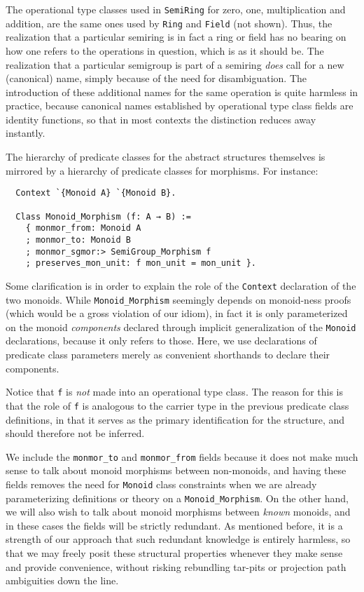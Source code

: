\documentclass[a4paper,10pt,runningheads]{llncs}
\begin{document}
The operational type classes used in \lstinline|SemiRing| for zero, one, multiplication and addition, are the same ones used by \lstinline|Ring| and \lstinline|Field| (not shown). Thus, the realization that a particular semiring is in fact a ring or field has no bearing on how one refers to the operations in question, which is as it should be. The realization that a particular semigroup is part of a semiring \emph{does} call for a new (canonical) name, simply because of the need for disambiguation. The introduction of these additional names for the same operation is quite harmless in practice, because canonical names established by operational type class fields are identity functions, so that in most contexts the distinction reduces away instantly.

The hierarchy of predicate classes for the abstract structures themselves is mirrored by a hierarchy of predicate classes for morphisms. For instance:
\begin{lstlisting}
  Context `{Monoid A} `{Monoid B}.

  Class Monoid_Morphism (f: A → B) :=
    { monmor_from: Monoid A
    ; monmor_to: Monoid B
    ; monmor_sgmor:> SemiGroup_Morphism f
    ; preserves_mon_unit: f mon_unit = mon_unit }.
\end{lstlisting}

Some clarification is in order to explain the role of the \lstinline|Context| declaration of the two monoids. While \lstinline|Monoid_Morphism| seemingly depends on monoid-ness proofs (which would be a gross violation of our idiom), in fact it is only parameterized on the monoid \emph{components} declared through implicit generalization of the \lstinline|Monoid| declarations, because it only refers to those. Here, we use declarations of predicate class parameters merely as convenient shorthands to declare their components.

Notice that \lstinline|f| is \emph{not} made into an operational type class. The reason for this is that the role of \lstinline|f| is analogous to the carrier type in the previous predicate class definitions, in that it serves as the primary identification for the structure, and should therefore not be inferred.

We include the \lstinline|monmor_to| and \lstinline|monmor_from| fields because it does not make much sense to talk about monoid morphisms between non-monoids, and having these fields removes the need for \lstinline|Monoid| class constraints when we are already parameterizing definitions or theory on a \lstinline|Monoid_Morphism|. On the other hand, we will also wish to talk about monoid morphisms between \emph{known} monoids, and in these cases the fields will be strictly redundant. As mentioned before, it is a strength of our approach that such redundant knowledge is entirely harmless, so that we may freely posit these structural properties whenever they make sense and provide convenience, without risking rebundling tar-pits or projection path ambiguities down the line.
\end{document}
